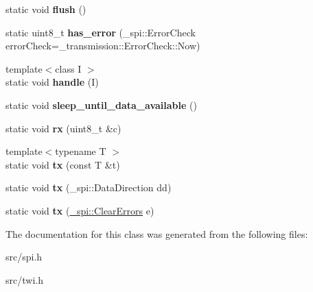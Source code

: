 \begin{DoxyCompactItemize}
\item 
\hypertarget{classSpiSlave_ae9aca59b22d840e5c0e9139efdd1e43d}{}\label{classSpiSlave_ae9aca59b22d840e5c0e9139efdd1e43d} 
static void {\bfseries flush} ()
\item 
\hypertarget{classSpiSlave_a7598120960f7a9b117bae0a7efadd521}{}\label{classSpiSlave_a7598120960f7a9b117bae0a7efadd521} 
static uint8\+\_\+t {\bfseries has\+\_\+error} (\+\_\+spi\+::\+Error\+Check error\+Check=\+\_\+transmission\+::\+Error\+Check\+::\+Now)
\item 
\hypertarget{classSpiSlave_a6368b7175f34d500adfda15ea769d27d}{}\label{classSpiSlave_a6368b7175f34d500adfda15ea769d27d} 
{\footnotesize template$<$class I $>$ }\\static void {\bfseries handle} (I)
\item 
\hypertarget{classSpiSlave_a22ea4c2e7dd73a8a3d4421ef1988fb6a}{}\label{classSpiSlave_a22ea4c2e7dd73a8a3d4421ef1988fb6a} 
static void {\bfseries sleep\+\_\+until\+\_\+data\+\_\+available} ()
\item 
\hypertarget{classSpiSlave_a56024a5c65f1621d6d6878442c63d0f8}{}\label{classSpiSlave_a56024a5c65f1621d6d6878442c63d0f8} 
static void {\bfseries rx} (uint8\+\_\+t \&c)
\item 
\hypertarget{classSpiSlave_a8b4d0097a955d25bed56bd828c01c2a3}{}\label{classSpiSlave_a8b4d0097a955d25bed56bd828c01c2a3} 
{\footnotesize template$<$typename T $>$ }\\static void {\bfseries tx} (const T \&t)
\item 
\hypertarget{classSpiSlave_aaaf2c74fb0b8332bc76e669e21ffd959}{}\label{classSpiSlave_aaaf2c74fb0b8332bc76e669e21ffd959} 
static void {\bfseries tx} (\+\_\+spi\+::\+Data\+Direction dd)
\item 
\hypertarget{classSpiSlave_ac7d9643f31fede2f24a49a4491e52732}{}\label{classSpiSlave_ac7d9643f31fede2f24a49a4491e52732} 
static void {\bfseries tx} (\hyperlink{class__transmission_1_1ClearErrors}{\+\_\+spi\+::\+Clear\+Errors} e)
\end{DoxyCompactItemize}


The documentation for this class was generated from the following files\+:\begin{DoxyCompactItemize}
\item 
src/spi.\+h\item 
src/twi.\+h\end{DoxyCompactItemize}
